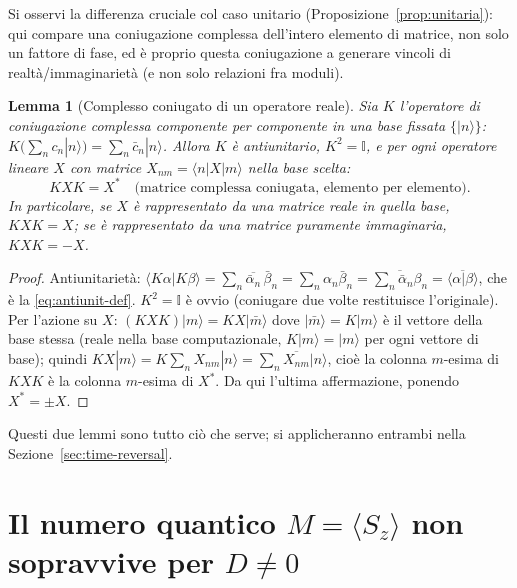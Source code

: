 \documentclass[11pt,a4paper]{article}
\newtheorem{lemma}{Lemma}
\begin{document}
\noindent
Si osservi la differenza cruciale col caso unitario (Proposizione~\ref{prop:unitaria}): qui
compare una coniugazione complessa dell'intero elemento di matrice, non solo un fattore di fase,
ed è proprio questa coniugazione a generare vincoli di realtà/immaginarietà (e non solo
relazioni fra moduli).

\begin{lemma}[Complesso coniugato di un operatore reale]
\label{lem:K}
Sia $K$ l'operatore di coniugazione complessa componente per componente in una base fissata
$\{|n\rangle\}$: $K\big(\sum_n c_n|n\rangle\big) = \sum_n \bar c_n|n\rangle$. Allora $K$ è
antiunitario, $K^2=\mathbb I$, e per ogni operatore lineare $X$ con matrice $X_{nm}=\langle n|X|m\rangle$
nella base scelta:
\begin{equation}
KXK = X^{*} \quad\text{(matrice complessa coniugata, elemento per elemento)}.
\end{equation}
In particolare, se $X$ è rappresentato da una matrice reale in quella base, $KXK=X$; se è
rappresentato da una matrice puramente immaginaria, $KXK=-X$.
\end{lemma}

\begin{proof}
Antiunitarietà: $\langle K\alpha|K\beta\rangle=\sum_n \overline{\bar\alpha_n}\,\bar\beta_n
=\sum_n \alpha_n\bar\beta_n = \overline{\sum_n\bar\alpha_n\beta_n}=\overline{\langle\alpha|\beta\rangle}$,
che è la \eqref{eq:antiunit-def}. $K^2=\mathbb I$ è ovvio (coniugare due volte restituisce
l'originale). Per l'azione su $X$: $(KXK)|m\rangle = KX|\bar m\rangle$ dove $|\bar m\rangle=K|m\rangle$
è il vettore della base stessa (reale nella base computazionale, $K|m\rangle=|m\rangle$ per ogni
vettore di base); quindi $KX|m\rangle = K\sum_n X_{nm}|n\rangle=\sum_n \overline{X_{nm}}|n\rangle$,
cioè la colonna $m$-esima di $KXK$ è la colonna $m$-esima di $X^*$. Da qui l'ultima affermazione,
ponendo $X^*=\pm X$.
\end{proof}

Questi due lemmi sono tutto ciò che serve; si applicheranno entrambi nella
Sezione~\ref{sec:time-reversal}.

\section{Il numero quantico $M=\langle S_z\rangle$ non sopravvive per $D\neq0$}
\end{document}
